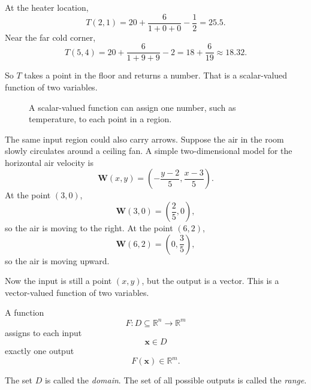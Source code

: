 At the heater location,
\[
    T(2,1)
    =
    20+\frac{6}{1+0+0}-\frac12
    =
    25.5.
\]
Near the far cold corner,
\[
    T(5,4)
    =
    20+\frac{6}{1+9+9}-2
    =
    18+\frac{6}{19}
    \approx 18.32.
\]

So \(T\) takes a point in the floor and returns a number.  That is a scalar-valued
function of two variables.

\begin{figure}[h]
\centering
{}
\caption{A scalar-valued function can assign one number, such as temperature, to each
point in a region.}
\end{figure}

The same input region could also carry arrows.  Suppose the air in the room slowly
circulates around a ceiling fan.  A simple two-dimensional model for the horizontal air
velocity is
\[
    \mathbf W(x,y)=\left(-\frac{y-2}{5},\frac{x-3}{5}\right).
\]
At the point \((3,0)\),
\[
    \mathbf W(3,0)=\left(\frac25,0\right),
\]
so the air is moving to the right.  At the point \((6,2)\),
\[
    \mathbf W(6,2)=\left(0,\frac35\right),
\]
so the air is moving upward.

Now the input is still a point \((x,y)\), but the output is a vector.  This is a
vector-valued function of two variables.

\begin{definition}
A function
\[
    F:D\subseteq \mathbb R^n\to \mathbb R^m
\]
assigns to each input
\[
    \mathbf x\in D
\]
exactly one output
\[
    F(\mathbf x)\in \mathbb R^m.
\]

The set \(D\) is called the \emph{domain}.  The set of all possible outputs is called the
\emph{range}.
\end{definition}

